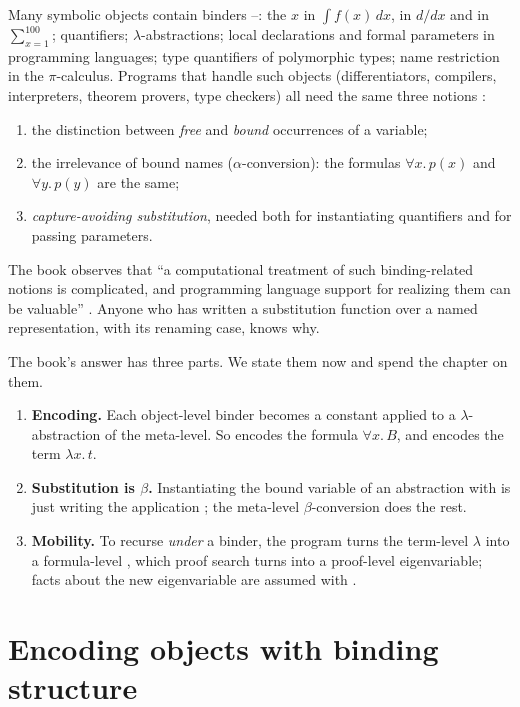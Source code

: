 Many symbolic objects contain binders --: the $x$ in $\int f(x)\,dx$, in
$d/dx$ and in $\sum_{x=1}^{100}$; quantifiers; $\lambda$-abstractions; local declarations and formal
parameters in programming languages; type quantifiers of polymorphic types; name restriction in the
$\pi$-calculus. Programs that handle such objects (differentiators, compilers, interpreters, theorem
provers, type checkers) all need the same three notions :
\begin{enumerate}[nosep]
  \item the distinction between \emph{free} and \emph{bound} occurrences of a variable;
  \item the irrelevance of bound names ($\alpha$-conversion): the formulas $\forall x.\,p(x)$ and
        $\forall y.\,p(y)$ are the same;
  \item \emph{capture-avoiding substitution}, needed both for instantiating quantifiers and for passing
        parameters.
\end{enumerate}
The book observes that \enquote{a computational treatment of such binding-related notions is complicated,
and programming language support for realizing them can be valuable} . Anyone who has written a
substitution function over a named representation, with its renaming case, knows why.

The book's answer has three parts. We state them now and spend the chapter on them.
\begin{enumerate}[nosep]
  \item \textbf{Encoding.} Each object-level binder becomes a constant applied to a
        $\lambda$-abstraction of the meta-level. So  encodes the formula $\forall x.\,B$, and
         encodes the term $\lambda x.\,t$.
  \item \textbf{Substitution is $\beta$.} Instantiating the bound variable of an abstraction  with
         is just writing the application ; the meta-level $\beta$-conversion does the rest.
  \item \textbf{Mobility.} To recurse \emph{under} a binder, the program turns the term-level $\lambda$ into a
        formula-level , which proof search turns into a proof-level eigenvariable; facts about the
        new eigenvariable are assumed with \lp{=>}.
\end{enumerate}

\section{Encoding objects with binding structure}\label{sec:lambdatree-encoding}

